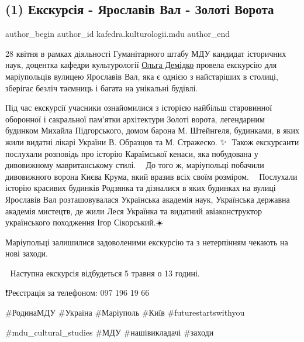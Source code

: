  
 
 
 
 

\subsection{(1) Екскурсія - Ярославів Вал - Золоті Ворота}
\label{sec:29_04_2023.fb.kafedra.kulturologii.mdu.1.ekskursia_jaroslaviv_val_zoloti_vorota}
 
\ifcmt
 author_begin
   author_id kafedra.kulturologii.mdu
 author_end
\fi

28 квітня в рамках діяльності Гуманітарного штабу МДУ кандидат історичних наук,
доцентка кафедри культурології \href{\urlDemidkoIA}{Ольга Демідко} провела екскурсію для маріупольців
вулицею Ярославів Вал, яка є однією з найстаріших в столиці, зберігає безліч
таємниць і багата на унікальні будівлі. 🏰💓 

Під час екскурсії учасники ознайомилися з історією найбільш старовинної
оборонної і сакральної пам'ятки архітектури Золоті ворота, легендарним будинком
Михайла Підгорського, домом барона М. Штейнгеля,  будинками, в яких жили
видатні лікарі України В. Образцов та М. Стражеско. ✨️🤩 Також екскурсанти
послухали розповідь про історію Караїмської кенаси, яка побудована у
дивовижному мавританському стилі. 🕍😊 До того ж, маріупольці побачили
дивовижного ворона Києва Крума, який вразив всіх своїм розміром. 💝🦅 Послухали
історію красивих будинків Родзянка та дізналися в яких будинках на вулиці
Ярославів Вал розташовувалася Українська академія наук, Українська державна
академія мистецтв, де жили Леся Українка та видатний авіаконструктор
українського походження Ігор Сікорський.☀️🤗 

Маріупольці залишилися задоволеними екскурсію та з нетерпінням чекають на нові заходи. 

🥰 Наступна екскурсія відбудеться 5 травня о 13 годині. 

❗️Реєстрація за телефоном: 097 196 19 66 

\#РодинаМДУ  \#Україна \#Маріуполь \#Київ  \#futurestartswithyou  

\#mdu\_cultural\_studies \#МДУ  \#нашівикладачі \#заходи
